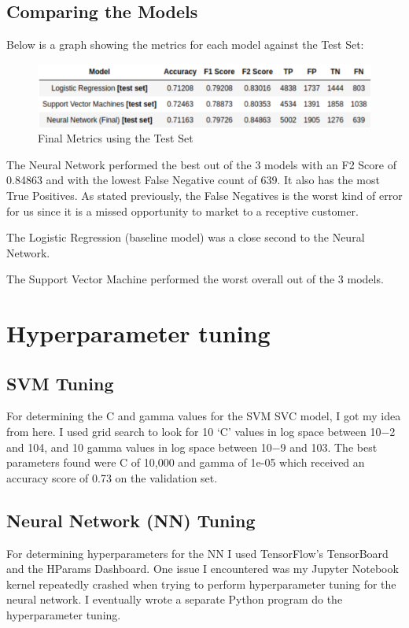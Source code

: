 \documentclass{article}
\begin{document}
\newpage
\subsection*{Comparing the Models}
Below is a graph showing the metrics for each model against the Test Set:

\begin{figure}[ht!]
  \includegraphics[width=0.9\linewidth]{img/15.png}
  \centering
  \caption{Final Metrics using the Test Set}
  \label{fig:15}
\end{figure}

The Neural Network performed the best out of the 3 models with an F2 Score of 0.84863 and with the lowest False Negative count of 639. It also has the most True Positives. As stated previously, the False Negatives is the worst kind of error for us since it is a missed opportunity to market to a receptive customer.

The Logistic Regression (baseline model) was a close second to the Neural Network.

The Support Vector Machine performed the worst overall out of the 3 models.

\section*{Hyperparameter tuning}

\subsection*{SVM Tuning}
For determining the C and gamma values for the SVM SVC model, I got my idea
from here. I used grid search to look for 10 ‘C’ values in log space between 10−2 and 104, and 10 gamma values in log space between 10−9 and 103. The best parameters found were C of 10,000 and gamma of 1e-05 which received an accuracy score of 0.73 on the validation set.

\subsection*{Neural Network (NN) Tuning}
For determining hyperparameters for the NN I used TensorFlow’s TensorBoard and the HParams Dashboard. One issue I encountered was my Jupyter Notebook kernel repeatedly crashed when trying to perform hyperparameter tuning for the neural network. I eventually wrote a separate Python program do the hyperparameter tuning.
\end{document}
